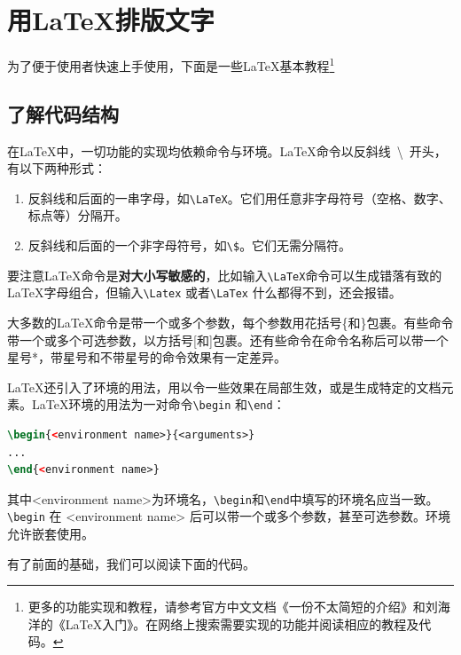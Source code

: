 \documentclass[oneside,zihao=-4]{ctexbook}
\begin{document}
\chapter{用\LaTeX{}排版文字}
 \qquad 为了便于使用者快速上手使用，下面是一些\LaTeX{}基本教程\footnote{更多的功能实现和教程，请参考官方中文文档《一份不太简短的\LaTeXe{}介绍》和刘海洋的《\LaTeX{}入门》。在网络上搜索需要实现的功能并阅读相应的教程及代码。}
\section{了解代码结构}
在\LaTeX{}中，一切功能的实现均依赖命令与环境。\LaTeX{}命令以反斜线\ \textbackslash \ 开头，有以下两种形式：
\begin{enumerate}
  \item 反斜线和后面的一串字母，如\texttt{\textbackslash LaTeX}。它们用任意非字母符号（空格、数字、标点等）分隔开。
  \item 反斜线和后面的一个非字母符号，如\texttt{\textbackslash \$}。它们无需分隔符。
\end{enumerate}\par
要注意\LaTeX{}命令是\textbf{对大小写敏感的}，比如输入\texttt{\textbackslash LaTeX}命令可以生成错落有致的\LaTeX{}字母组合，但输入\texttt{\textbackslash Latex} 或者\texttt{\textbackslash LaTex} 什么都得不到，还会报错。\par
大多数的\LaTeX{}命令是带一个或多个参数，每个参数用花括号\{和\}包裹。有些命令带一个或多个可选参数，以方括号[和]包裹。还有些命令在命令名称后可以带一个星号*，带星号和不带星号的命令效果有一定差异。\par
\LaTeX{}还引入了环境的用法，用以令一些效果在局部生效，或是生成特定的文档元素。\LaTeX{}环境的用法为一对命令\texttt{\textbackslash begin} 和\texttt{\textbackslash end}：
\begin{lstlisting}[language=tex]
\begin{<environment name>}{<arguments>}
...
\end{<environment name>}
\end{lstlisting}\par
其中<environment name>为环境名，\texttt{\textbackslash begin}和\texttt{\textbackslash end}中填写的环境名应当一致。\texttt{\textbackslash begin}  在
<environment name> 后可以带一个或多个参数，甚至可选参数。环境允许嵌套使用。\par
\newpage
有了前面的基础，我们可以阅读下面的代码。\par
\end{document}
